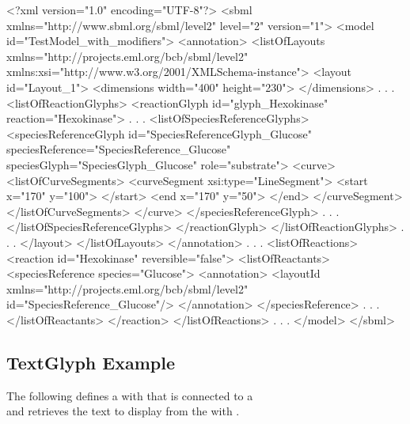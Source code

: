 \label{example:speciesreferenceid}
\begin{example}
<?xml version="1.0" encoding="UTF-8"?>
<sbml xmlns="http://www.sbml.org/sbml/level2" level="2" version="1">
  <model id="TestModel_with_modifiers">
    <annotation>
     <listOfLayouts xmlns="http://projects.eml.org/bcb/sbml/level2"
              xmlns:xsi="http://www.w3.org/2001/XMLSchema-instance">
      <layout id="Layout_1">
        <dimensions width="400" height="230">
        </dimensions>
              .
              .
              .
        <listOfReactionGlyphs>
          <reactionGlyph id="glyph_Hexokinase" reaction="Hexokinase">
                    .
                    .
                    .
            <listOfSpeciesReferenceGlyphs>
              <speciesReferenceGlyph id="SpeciesReferenceGlyph_Glucose"
                   speciesReference="SpeciesReference_Glucose"
                   speciesGlyph="SpeciesGlyph_Glucose" role="substrate">
                <curve>
                  <listOfCurveSegments>
                    <curveSegment xsi:type="LineSegment">
                      <start x="170" y="100">
                      </start>
                      <end x="170" y="50">
                      </end>
                    </curveSegment>
                  </listOfCurveSegments>
                </curve>
              </speciesReferenceGlyph>
                        .
                        .
                        . 
            </listOfSpeciesReferenceGlyphs>
          </reactionGlyph>
        </listOfReactionGlyphs>
             .
             .
             .
      </layout>
     </listOfLayouts>
    </annotation>
        .
        .
        .
    <listOfReactions>
      <reaction id="Hexokinase" reversible="false">
        <listOfReactants>
          <speciesReference species="Glucose">
            <annotation>
              <layoutId xmlns="http://projects.eml.org/bcb/sbml/level2"
                        id="SpeciesReference_Glucose"/>
            </annotation>
          </speciesReference>
                .
                .
                .
        </listOfReactants>
      </reaction>
    </listOfReactions>
          .
          .
          .  
  </model>
</sbml>
\end{example}


\subsection{TextGlyph Example}
The following defines a \TextGlyph with  
that is connected to a \SpeciesGlyph \\  
and retrieves the text to display from the \Species with 
. 

